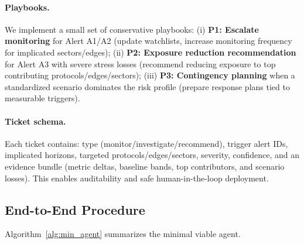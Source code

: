 \paragraph{Playbooks.}
We implement a small set of conservative playbooks:
(i) \textbf{P1: Escalate monitoring} for Alert A1/A2 (update watchlists, increase monitoring frequency for implicated sectors/edges);
(ii) \textbf{P2: Exposure reduction recommendation} for Alert A3 with severe stress losses (recommend reducing exposure to top contributing protocols/edges/sectors);
(iii) \textbf{P3: Contingency planning} when a standardized scenario dominates the risk profile (prepare response plans tied to measurable triggers).

\paragraph{Ticket schema.}
Each ticket contains: type (monitor/investigate/recommend), trigger alert IDs, implicated horizons, targeted protocols/edges/sectors, severity, confidence, and an evidence bundle (metric deltas, baseline bands, top contributors, and scenario losses). This enables auditability and safe human-in-the-loop deployment.

\subsection{End-to-End Procedure}
Algorithm~\ref{alg:min_agent} summarizes the minimal viable agent.

